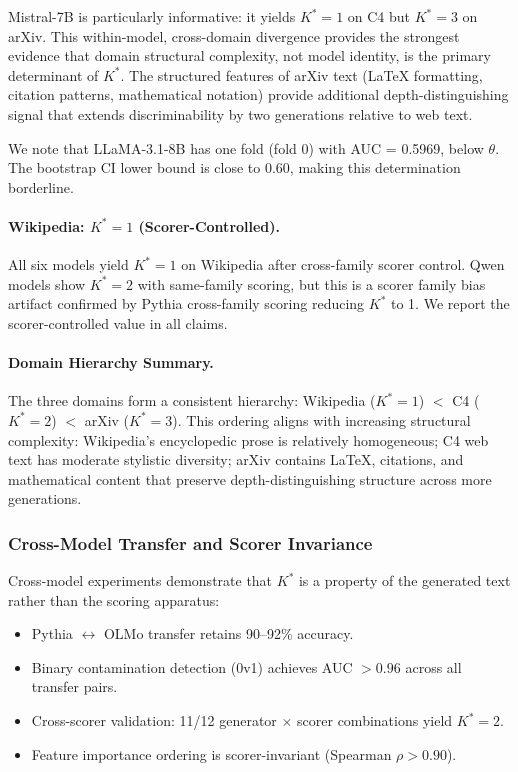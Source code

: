 \documentclass[11pt,a4paper]{article}
\begin{document}
Mistral-7B is particularly informative: it yields $K^*=1$ on C4 but $K^*=3$ on arXiv. This within-model, cross-domain divergence provides the strongest evidence that domain structural complexity, not model identity, is the primary determinant of $K^*$. The structured features of arXiv text (LaTeX formatting, citation patterns, mathematical notation) provide additional depth-distinguishing signal that extends discriminability by two generations relative to web text.

We note that LLaMA-3.1-8B has one fold (fold 0) with AUC = 0.5969, below $\theta$. The bootstrap CI lower bound is close to 0.60, making this determination borderline.

\paragraph{Wikipedia: $K^*=1$ (Scorer-Controlled).}
All six models yield $K^*=1$ on Wikipedia after cross-family scorer control. Qwen models show $K^*=2$ with same-family scoring, but this is a scorer family bias artifact confirmed by Pythia cross-family scoring reducing $K^*$ to 1. We report the scorer-controlled value in all claims.

\paragraph{Domain Hierarchy Summary.}
The three domains form a consistent hierarchy: Wikipedia ($K^*=1$) $<$ C4 ($K^*=2$) $<$ arXiv ($K^*=3$). This ordering aligns with increasing structural complexity: Wikipedia's encyclopedic prose is relatively homogeneous; C4 web text has moderate stylistic diversity; arXiv contains LaTeX, citations, and mathematical content that preserve depth-distinguishing structure across more generations.

\subsubsection{Cross-Model Transfer and Scorer Invariance}
\label{sec:cross_model}

Cross-model experiments demonstrate that $K^*$ is a property of the generated text rather than the scoring apparatus:

\begin{itemize}[leftmargin=*,nosep]
\item Pythia $\leftrightarrow$ OLMo transfer retains 90--92\% accuracy.
\item Binary contamination detection (0v1) achieves AUC $> 0.96$ across all transfer pairs.
\item Cross-scorer validation: 11/12 generator $\times$ scorer combinations yield $K^*=2$.
\item Feature importance ordering is scorer-invariant (Spearman $\rho > 0.90$).
\end{itemize}
\end{document}
